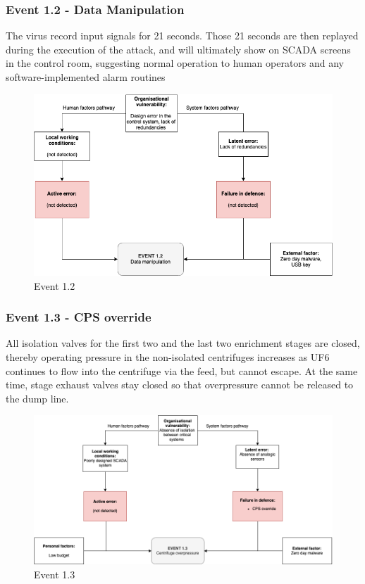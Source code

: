 \documentclass[12pt]{article}
\begin{document}
    \subsubsection{Event 1.2 - Data Manipulation}
    The virus record input signals for 21 seconds. Those 21 seconds are then replayed during the execution of the attack, and will ultimately show on SCADA screens in the control room, suggesting normal operation to human operators and any software-implemented alarm routines
        \begin{figure}[H]
        \centering
        \includegraphics[width=\textwidth]{event12.png}
        \caption{Event 1.2}
        \label{fig:event12}
        \end{figure}
        
    \subsubsection{Event 1.3 - CPS override}
    All isolation valves for the first two and the last two enrichment stages are closed, thereby operating pressure in the non-isolated centrifuges increases as UF6 continues to flow into the centrifuge via the feed, but cannot escape. At the same time, stage exhaust valves stay closed so that overpressure cannot be released to the dump line.
        \begin{figure}[H]
        \centering
        \includegraphics[width=\textwidth]{event13.png}
        \caption{Event 1.3}
        \label{fig:event13}
        \end{figure}
        
\end{document}
